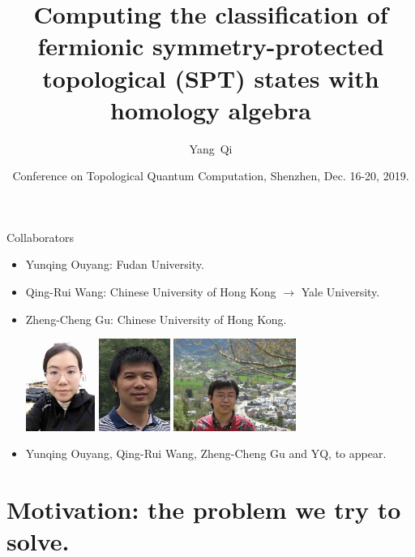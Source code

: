 \documentclass[xcolor=table, aspectratio=169]{beamer}
\title[Computing fSPT with homology algebra] %
{Computing the classification of fermionic symmetry-protected topological (SPT) states with homology algebra}
\author[Y Qi] %
{Yang~Qi}
\institute[Fudan] %
{Department of Physics, Fudan University}
\date{Conference on Topological Quantum Computation, Shenzhen, Dec. 16-20, 2019.}
\begin{document}
\begin{frame}
  \titlepage
\end{frame}

\begin{frame}{Collaborators}
\begin{itemize}
\item Yunqing Ouyang: Fudan University.
\item Qing-Rui Wang: Chinese University of Hong Kong $\rightarrow$ Yale University.
\item Zheng-Cheng Gu: Chinese University of Hong Kong.
\begin{center}
	\includegraphics[height=3cm]{../people/yunqing}
	\includegraphics[height=3cm]{../people/qingrui}
	\includegraphics[height=3cm]{../people/zhengcheng}
\end{center}
\item Yunqing Ouyang, Qing-Rui Wang, Zheng-Cheng Gu and YQ, to appear.
\end{itemize}
\end{frame}

\section{Motivation: the problem we try to solve.}
\end{document}
